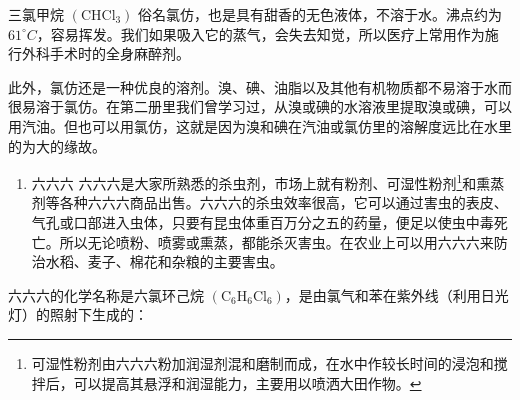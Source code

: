 三氯甲烷 \(\left(\mathrm{CHCl}_{3}\right)\)
俗名氯仿，也是具有甜香的无色液体，不溶于水。沸点约为
\(61^{\circ}C\)，容易挥发。我们如果吸入它的蒸气，会失去知觉，所以医疗上常用作为施行外科手术时的全身麻醉剂。

此外，氯仿还是一种优良的溶剂。溴、碘、油脂以及其他有机物质都不易溶于水而很易溶于氯仿。在第二册里我们曾学习过，从溴或碘的水溶液里提取溴或碘，可以用汽油。但也可以用氯仿，这就是因为溴和碘在汽油或氯仿里的溶解度远比在水里的为大的缘故。

\begin{enumerate}[start=3]
\item
  六六六
  六六六是大家所熟悉的杀虫剂，市场上就有粉剂、可湿性粉剂\footnote{可湿性粉剂由六六六粉加润湿剂混和磨制而成，在水中作较长时间的浸泡和搅拌后，可以提高其悬浮和润湿能力，主要用以喷洒大田作物。}和熏蒸剂等各种六六六商品出售。六六六的杀虫效率很高，它可以通过害虫的表皮、气孔或口部进入虫体，只要有昆虫体重百万分之五的药量，便足以使虫中毒死亡。所以无论喷粉、喷雾或熏蒸，都能杀灭害虫。在农业上可以用六六六来防治水稻、麦子、棉花和杂粮的主要害虫。
\end{enumerate}

六六六的化学名称是六氯环己烷
\(\left(\mathrm{C}_{6}\mathrm{H}_{6}\mathrm{Cl}_{6}\right)\)，是由氯气和苯在紫外线（利用日光灯）的照射下生成的：

